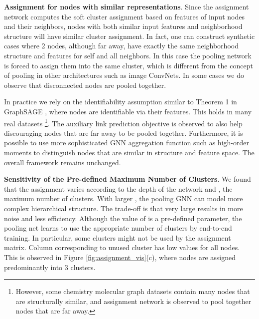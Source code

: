 \documentclass{article}
\newcommand{\jure}[1]{{{\textcolor{red}{[Jure: #1]}}}}
\newcommand{\xhdr}[1]{{\noindent\bfseries #1}.}
\newcommand{\name}{\textsc{DiffPool}\xspace}
\newcommand{\cut}[1]{}
\begin{document}
\xhdr{Assignment for nodes with similar representations}
Since the assignment network computes the soft cluster assignment based on features of input nodes and their neighbors, nodes with both similar input features and neighborhood structure will have similar cluster assignment.
In fact, one can construct synthetic cases where 2 nodes, although far away, have exactly the same neighborhood structure and features for self and all neighbors. In this case the pooling network is forced to assign them into the same cluster, which is different from the concept of pooling in other architectures such as image ConvNets. In some cases we do observe that disconnected nodes are pooled together.

In practice we rely on the identifiability assumption similar to Theorem 1 in GraphSAGE \cite{hamilton2017inductive}, where nodes are identifiable via their features. This holds in many real datasets \footnote{However, some chemistry molecular graph datasets contain many nodes that are structurally similar, and assignment network is observed to pool together nodes that are far away.}. 
The auxiliary link prediction objective is observed to also help discouraging nodes that are far away to be pooled together. Furthermore, it is possible to use more sophisticated GNN aggregation function such as high-order moments \cite{verma2018graph} to distinguish nodes that are similar in structure and feature space. The overall framework remains unchanged.

\xhdr{Sensitivity of the Pre-defined Maximum Number of Clusters}
We found that the assignment varies according to the depth of the network and , the maximum number of clusters. With larger , the pooling GNN can model more complex hierarchical structure. The trade-off is that very large  results in more noise and less efficiency. 
Although the value of  is a pre-defined parameter, the pooling net learns to use the appropriate number of clusters by end-to-end training. 
In particular, some clusters might not be used by the assignment matrix. Column corresponding to unused cluster has low values for all nodes. This is observed in Figure \ref{fig:assignment_vis}(c), where nodes are assigned predominantly into 3 clusters.


\cut{
\xhdr{Number of clusters} \jure{why is this in experiments? We can cut this or make it into an experimental result.}
In addithttps://v2.overleaf.com/projection, although we globally set the number of clusters to be  of the nodes, the assignment network automatically learns the appropriate number of meaningful clusters to assign for different graphs in the dataset, in order to optimize the classification objective.
\cut{
\begin{figure}[ht!]
    \centering
    \texttt{[image: figs/diffpool\_vis.pdf]}
    \caption{Visualization of hierarchical cluster assignment over two \name\ layers, using an example graph from \textsc{Collab}.
      Nodes in the right-hand side plot correspond to cluster in the original graph (left-hand side). Colors are used to connect the nodes/clusters across the graphs, and dotted lines are used to indicate clusters.}
    \label{fig:assignment_vis}
\end{figure}
}
}
\end{document}
